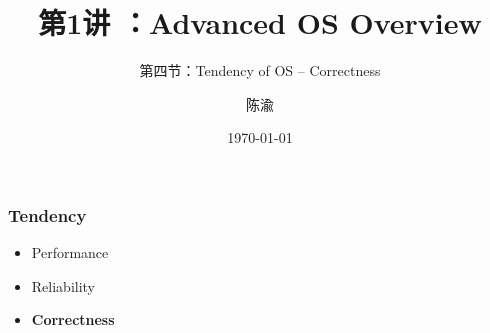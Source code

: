 


\title[第1讲]{第1讲 ：Advanced OS Overview} %
\subtitle{第四节：Tendency of OS -- Correctness}
\author{陈渝} %
\date{\today} %




\begin{frame}
\titlepage %
\end{frame}

%
%
\begin{frame}
	\frametitle{Tendency}

	\begin{itemize}\huge
	\item Performance
	\item Reliability
	\item \textbf{Correctness}
	
\end{itemize}
\end{frame}



